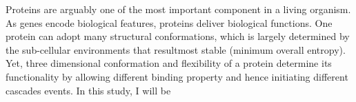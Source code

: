 Proteins are arguably one of the most important component in a living organism. As genes encode biological features, proteins deliver biological functions. One protein can adopt many structural conformations, which is largely determined by the sub-cellular environments that resultmost stable (minimum overall entropy). Yet, three dimensional conformation and flexibility of a protein determine its functionality by allowing different binding property and hence initiating different cascades events. In this study, I will be 